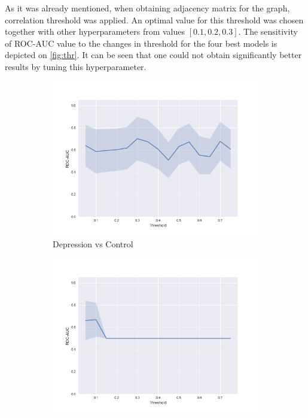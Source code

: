 \documentclass[12pt]{extarticle}
\theoremstyle{definition}
\theoremstyle{remark}
\begin{document}
	
	As it was already mentioned, when obtaining adjacency matrix for the graph, correlation threshold was applied. An optimal value for this threshold was chosen together with other hyperparameters from values $[0.1, 0.2, 0.3]$. The sensitivity of ROC-AUC value to the changes in threshold for the four best models is depicted on \cref{fig:thr}. It can be seen that one could not obtain significantly better results by tuning this hyperparameter.
	
	\begin{figure}[H]
		\begin{subfigure}[b]{0.48\textwidth}
			\centering
			\includegraphics[width=\linewidth]{pic/DC_th.png}
			\caption{Depression vs Control}
			\label{fig:bdi}
		\end{subfigure}
		\begin{subfigure}[b]{0.48\textwidth}
			\centering
			\includegraphics[width=\linewidth]{pic/D_th.png}

\end{subfigure}
\end{figure}
\end{document}
